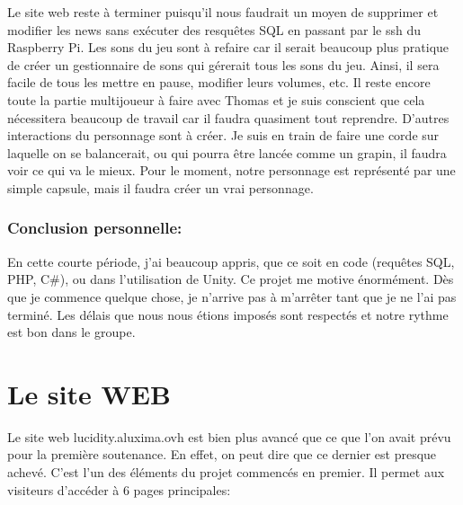 \documentclass[a4paper]{article}
\begin{document}
\quad

    Le site web reste à terminer puisqu’il nous faudrait un moyen de supprimer et modifier les news sans exécuter des resquêtes SQL en passant par le ssh du Raspberry Pi.
Les sons du jeu sont à refaire car il serait beaucoup plus pratique de créer un gestionnaire de sons qui gérerait tous les sons du jeu. Ainsi, il sera facile de tous les mettre en pause, modifier leurs volumes, etc.
Il reste encore toute la partie multijoueur à faire avec Thomas et je suis conscient que cela nécessitera beaucoup de travail car il faudra quasiment tout reprendre.
D’autres interactions du personnage sont à créer. Je suis en train de faire une corde sur laquelle on se balancerait, ou qui pourra être lancée comme un grapin, il faudra voir ce qui va le mieux.
Pour le moment, notre personnage est représenté par une simple capsule, mais il faudra créer un vrai personnage.

\quad

		\subsubsection{Conclusion personnelle:}

\quad

En cette courte période, j’ai beaucoup appris, que ce soit en code (requêtes SQL, PHP, C\#), ou dans l’utilisation de Unity. 
Ce projet me motive énormément. Dès que je commence quelque chose, je n’arrive pas à m’arrêter tant que je ne l’ai pas terminé.
Les délais que nous nous étions imposés sont respectés et notre rythme est bon dans le groupe.

\quad

\newpage


\section {Le site WEB}

\quad

    Le site web lucidity.aluxima.ovh est bien plus avancé que ce que l’on avait prévu pour la première soutenance. En effet, on peut dire que ce dernier est presque achevé. C’est l’un des éléments du projet commencés en premier. Il permet aux visiteurs d’accéder à 6 pages principales:
\end{document}
